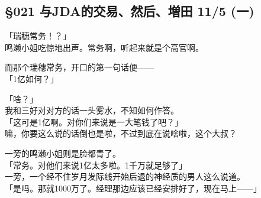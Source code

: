 \subsection{§021 与JDA的交易、然后、増田 11/5 (一)}

「瑞穗常务！？」\\

鸣濑小姐吃惊地出声。常务啊，听起来就是个高官啊。

而那个瑞穗常务，开口的第一句话便——\\

「1亿如何？」

「啥？」\\

我和三好对对方的话一头雾水，不知如何作答。\\

「这可是1亿啊。对你们来说是一大笔钱了吧？」\\

嘛，你要这么说的话倒也是啦，不过到底在说啥啦，这个大叔？

一旁的鸣濑小姐则是脸都青了。\\

「常务。对他们来说1亿太多啦。1千万就足够了」\\

一旁，一个经不住岁月发际线开始后退的神经质的男人这么说道。\\

「是吗。那就1000万了。经理那边应该已经安排好了，现在马上——」

